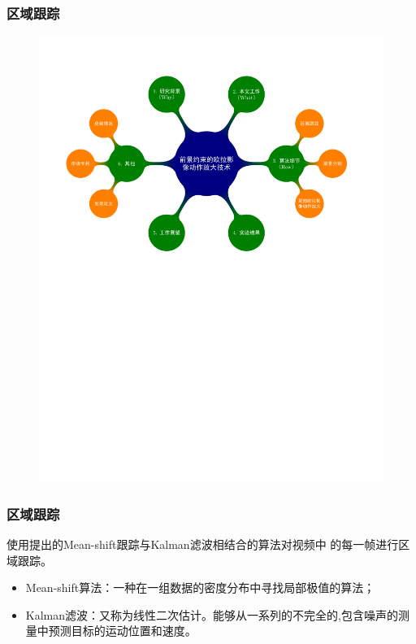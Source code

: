 \documentclass[xcolor=svgnames,serif,table]{beamer}
\begin{document}
\begin{frame}
  \frametitle{区域跟踪}
  \vspace{-2.5em}
  \begin{figure}
    \centering
    \includegraphics[width=\textwidth, page=5]{mindmap.pdf}
  \end{figure}
\end{frame}

\begin{frame}
  \frametitle{区域跟踪}
  使用\cite{常发亮2007}提出的Mean-shift跟踪与Kalman滤波相结合的算法对视频中
  的每一帧进行区域跟踪。

  \begin{itemize}
  \item Mean-shift算法：一种在一组数据的密度分布中寻找局部极值的算法；
  \item Kalman滤波：又称为线性二次估计。能够从一系列的不完全的,包含噪声的测量中预测目标的运动位置和速度。
  \end{itemize}
\end{frame}
\end{document}
